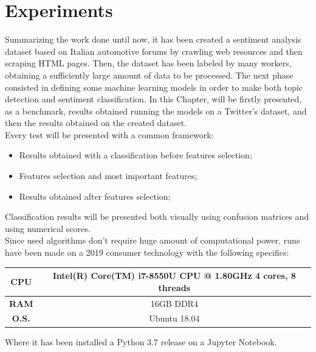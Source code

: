 
\chapter{Experiments}

Summarizing the work done until now, it has been created a sentiment analysis dataset based on Italian automotive forums by crawling web resources and then scraping HTML pages. Then, the dataset has been labeled by many workers, obtaining a sufficiently large amount of data to be processed. The next phase consisted in defining some machine learning models in order to make both topic detection and sentiment classification. In this Chapter, will be firstly presented, as a benchmark, results obtained running the models on a Twitter's dataset, and then the results obtained on the created dataset.\\
Every test will be presented with a common framework: 
\begin{itemize}
	\item Results obtained with a classification before features selection;
	\item Features selection and most important features;
	\item Results obtained after features selection;
\end{itemize}
Classification results will be presented both visually using confusion matrices and using numerical scores.\\
Since used algorithms don't require huge amount of computational power, runs have been made on a 2019 consumer technology with the following specifics:
\begin{center}
	\begin{tabular}{ |c||c| } 
		\hline
		\textbf{CPU} & Intel(R) Core(TM) i7-8550U CPU @ 1.80GHz 4 cores, 8 threads\\ 
		\hline
		\textbf{RAM} & 16GB DDR4 \\
		\hline
		\textbf{O.S.} & Ubuntu 18.04 \\
		\hline
	\end{tabular}
\end{center}
Where it has been installed a Python 3.7 release on a Jupyter Notebook.



